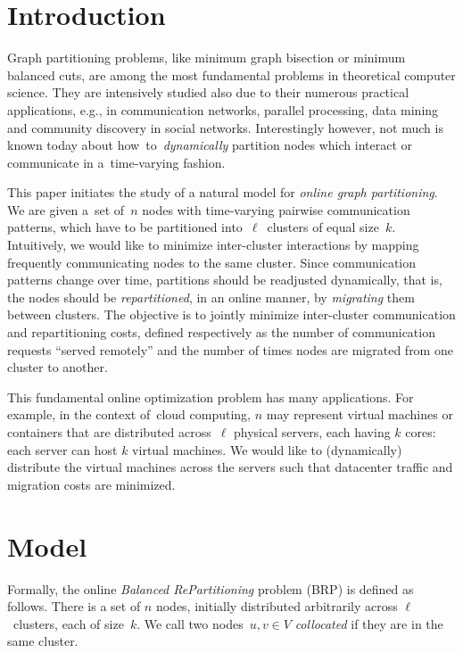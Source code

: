 
\section{Introduction}

Graph partitioning problems, like minimum graph bisection or minimum balanced
cuts, are among the most fundamental problems in theoretical computer science.
They are intensively studied also due to their numerous practical
applications, e.g., in communication networks, parallel processing, data
mining and community discovery in social networks. Interestingly however, not
much is known today about how~to~\emph{dynamically} partition nodes which
interact or communicate in a~time-varying fashion.

This paper initiates the study of a natural model for \emph{online graph
partitioning}. We are given a~set of~$n$ nodes with time-varying pairwise
communication patterns, which have to be partitioned into~$\ell$~clusters of
equal size~$k$. Intuitively, we would like to minimize inter-cluster
interactions by mapping frequently communicating nodes to the same cluster.
Since communication patterns change over time, partitions should be
readjusted dynamically, that is, the nodes should be \emph{repartitioned}, in
an online manner, by \emph{migrating} them between clusters. The objective is
to jointly minimize inter-cluster communication and repartitioning costs,
defined respectively as the number of communication requests ``served
remotely'' and the number of times nodes are migrated from one cluster to
another.

This fundamental online optimization problem has many applications. For
example, in the context of~cloud computing, $n$ may represent virtual machines
or containers that are distributed across~$\ell$ physical servers, each having
$k$ cores: each server can host $k$ virtual machines. We would like to
(dynamically) distribute the virtual machines across the servers such that
datacenter traffic and migration costs are minimized.




\section{Model}

Formally, the online \emph{Balanced RePartitioning} problem (BRP) is defined as
follows. There is a set of $n$ nodes, initially distributed arbitrarily
across $\ell$~clusters, each of size~$k$. We call two nodes~$u,v\in V$
\emph{collocated} if they are in the same cluster.


